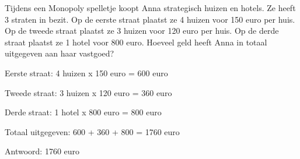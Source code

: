 \begin{opgave}
Tijdens een Monopoly spelletje koopt Anna strategisch huizen en hotels. Ze 
heeft 3 straten in bezit. Op de eerste straat plaatst ze 4 huizen voor 150 
euro per huis. Op de tweede straat plaatst ze 3 huizen voor 120 euro per huis. 
Op de derde straat plaatst ze 1 hotel voor 800 euro. Hoeveel geld heeft Anna 
in totaal uitgegeven aan haar vastgoed?
\end{opgave}

\begin{oplossing}
Eerste straat: 4 huizen x 150 euro = 600 euro

Tweede straat: 3 huizen x 120 euro = 360 euro

Derde straat: 1 hotel x 800 euro = 800 euro

Totaal uitgegeven:
600 + 360 + 800 = 1760 euro

Antwoord: 1760 euro
\end{oplossing}